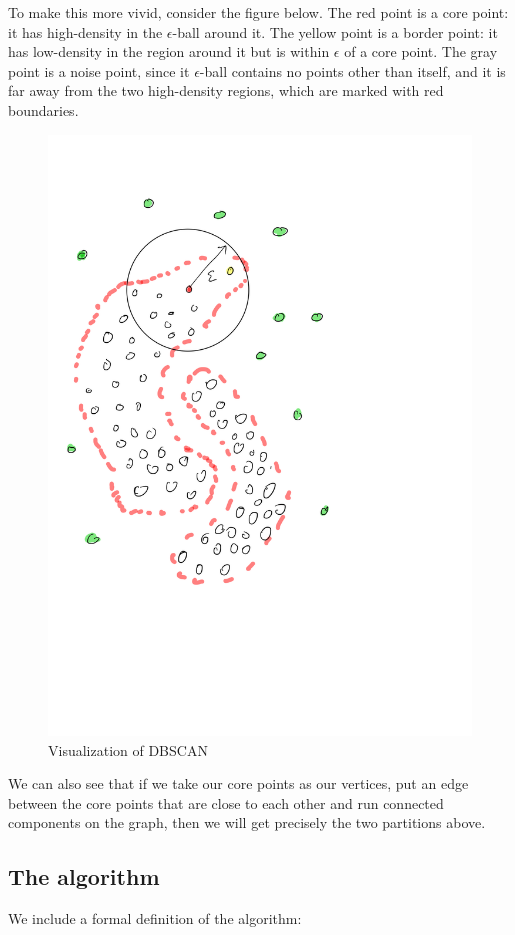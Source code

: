   To make this more vivid, consider the figure below. The red point is a core point:
  it has high-density in the $\epsilon$-ball around it. The yellow point is a border
  point: it has low-density in the region around it but is within $\epsilon$ of
  a core point. The gray point is a noise point, since it $\epsilon$-ball
  contains no points other than itself, and it is far away from the two high-density
  regions, which are marked with red boundaries.

  \begin{figure}[h]
  \centering
  \includegraphics[width=.7\linewidth]{chapter_2/files/dbscan.png}
  \caption{Visualization of DBSCAN}
  \end{figure}

  We can also see that if we take our core points as our vertices, put an edge between
  the core points that are close to each other and run connected components on
  the graph, then we will get precisely the two partitions above.

  \subsection{The algorithm}

  We include a formal definition of the algorithm:

